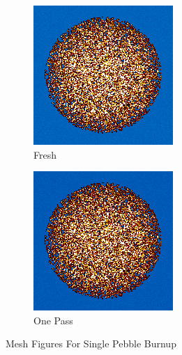 \begin{figure}[H]
\centering
%
\begin{subfigure}{0.4\textwidth}
  \includegraphics[width=0.95\linewidth]{figures/burn-20-bstep0}
  \caption{Fresh}
  \label{fig:bstep0}
\end{subfigure}%
%
\begin{subfigure}{0.4\textwidth}
  \includegraphics[width=0.95\linewidth]{figures/burn-20-bstep1}
  \caption{One Pass}
  \label{fig:bstep1}
\end{subfigure}%

\caption{Mesh Figures For Single Pebble Burnup}
\end{figure}

